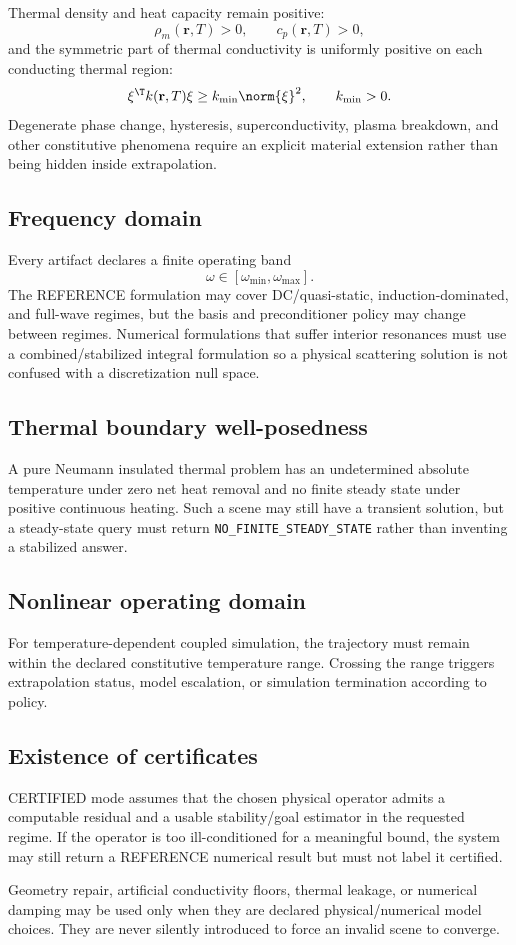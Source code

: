 Thermal density and heat capacity remain positive:
\[
 \rho_m(\mathbf r,T)>0,\qquad c_p(\mathbf r,T)>0,
\]
and the symmetric part of thermal conductivity is uniformly positive on each
conducting thermal region:
\[
 \xi^\T k(\mathbf r,T)\xi
 \ge k_{\min}\norm{\xi}^2,\qquad k_{\min}>0.
\]
Degenerate phase change, hysteresis, superconductivity, plasma breakdown, and
other constitutive phenomena require an explicit material extension rather than
being hidden inside extrapolation.

\subsection{Frequency domain}

Every artifact declares a finite operating band
\[
 \omega\in[\omega_{\min},\omega_{\max}].
\]
The REFERENCE formulation may cover DC/quasi-static, induction-dominated, and
full-wave regimes, but the basis and preconditioner policy may change between
regimes. Numerical formulations that suffer interior resonances must use a
combined/stabilized integral formulation so a physical scattering solution is
not confused with a discretization null space.

\subsection{Thermal boundary well-posedness}

A pure Neumann insulated thermal problem has an undetermined absolute
temperature under zero net heat removal and no finite steady state under
positive continuous heating. Such a scene may still have a transient solution,
but a steady-state query must return \texttt{NO\_FINITE\_STEADY\_STATE} rather
than inventing a stabilized answer.

\subsection{Nonlinear operating domain}

For temperature-dependent coupled simulation, the trajectory must remain within
the declared constitutive temperature range. Crossing the range triggers
extrapolation status, model escalation, or simulation termination according to
policy.

\subsection{Existence of certificates}

CERTIFIED mode assumes that the chosen physical operator admits a computable
residual and a usable stability/goal estimator in the requested regime. If the
operator is too ill-conditioned for a meaningful bound, the system may still
return a REFERENCE numerical result but must not label it certified.

\begin{principle}
Geometry repair, artificial conductivity floors, thermal leakage, or numerical
damping may be used only when they are declared physical/numerical model
choices. They are never silently introduced to force an invalid scene to
converge.
\end{principle}
